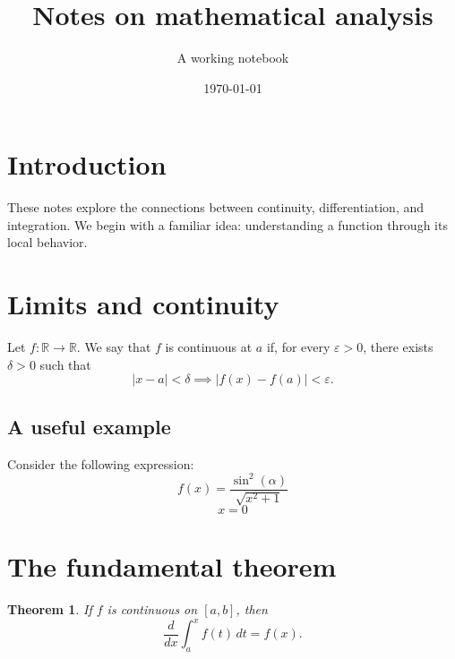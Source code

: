 \documentclass[11pt]{article}
\title{Notes on mathematical analysis}
\author{A working notebook}
\date{\today}
\newcommand{\R}{\mathbb{R}}
\newtheorem{theorem}{Theorem}
\begin{document}
\maketitle

\section{Introduction}
These notes explore the connections between continuity,
differentiation, and integration. We begin with a familiar
idea: understanding a function through its local behavior.

\section{Limits and continuity}
\label{sec:limits}
Let $f : \R \to \R$. We say that $f$ is continuous at $a$
if, for every $\varepsilon > 0$, there exists $\delta > 0$ such that
\begin{equation}
  |x-a| < \delta \implies |f(x)-f(a)| < \varepsilon.
  \label{eq:continuity}
\end{equation}

\subsection{A useful example}
Consider the following expression:
\[
  f(x) = \frac{\sin^2(\alpha)}{\sqrt{x^2+1}}
\]
\[
  x = 0
\]

\section{The fundamental theorem}
\begin{theorem}
If $f$ is continuous on $[a,b]$, then
\[
  \frac{d}{dx}\int_a^x f(t)\,dt = f(x).
\]
\end{theorem}




\end{document}

